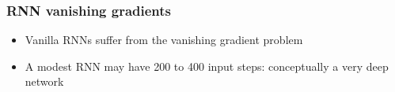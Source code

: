 \begin{frame}[fragile] \frametitle{RNN vanishing gradients}
\begin{itemize}
\item Vanilla RNNs suffer from the vanishing gradient problem
\item A modest RNN may have 200 to 400 input steps: conceptually a very deep network

\end{itemize}
\end{frame}
